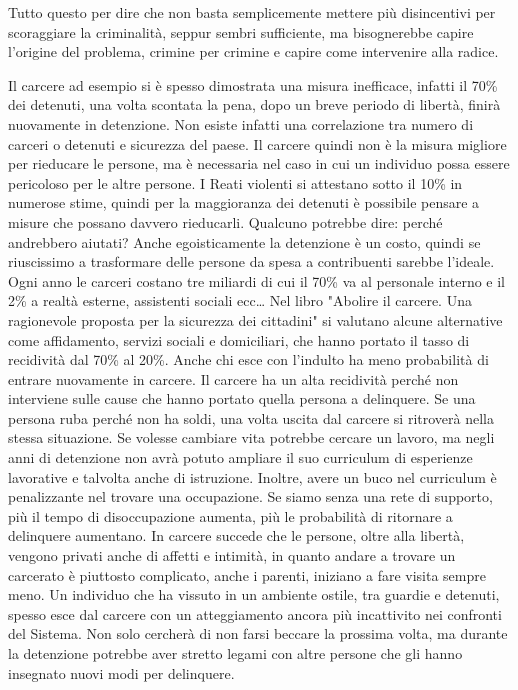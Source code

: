 \documentclass[12pt]{book} %
\begin{document}
Tutto questo per dire che non basta semplicemente mettere più disincentivi per scoraggiare la criminalità, seppur sembri sufficiente, ma bisognerebbe capire l'origine del problema, crimine per crimine e capire come intervenire alla radice.

Il carcere ad esempio si è spesso dimostrata una misura inefficace, infatti il 70\% dei detenuti, una volta scontata la pena, dopo un breve periodo di libertà, finirà nuovamente in detenzione. Non esiste infatti una correlazione tra numero di carceri o detenuti e sicurezza del paese. Il carcere quindi non è la misura migliore per rieducare le persone, ma è necessaria nel caso in cui un individuo possa essere pericoloso per le altre persone.
I Reati violenti si attestano sotto il 10\% in numerose stime, quindi per la maggioranza dei detenuti è possibile pensare a misure che possano davvero rieducarli.
Qualcuno potrebbe dire: perché andrebbero aiutati? Anche egoisticamente la detenzione è un costo, quindi se riuscissimo a trasformare delle persone da spesa a contribuenti sarebbe l'ideale. Ogni anno le carceri costano tre miliardi di cui il 70\% va al personale interno e il 2\% a realtà esterne,
assistenti sociali ecc…
Nel libro "Abolire il carcere. Una ragionevole proposta per la sicurezza dei cittadini"  si valutano alcune alternative come affidamento, servizi sociali e domiciliari, che hanno portato il tasso
di recidività dal 70\% al 20\%. Anche chi esce con l'indulto ha meno probabilità di entrare nuovamente in carcere. 
Il carcere ha un alta recidività perché non interviene sulle cause che hanno portato quella persona a delinquere.
Se una persona ruba perché non ha soldi, una volta uscita dal carcere si ritroverà nella stessa situazione.
Se volesse cambiare vita potrebbe cercare un lavoro, ma negli anni di detenzione non avrà potuto ampliare il suo curriculum di esperienze lavorative e talvolta anche di istruzione. Inoltre, avere un buco nel curriculum è penalizzante nel trovare una occupazione. 
Se siamo senza una rete di supporto, più il tempo di disoccupazione aumenta, più le probabilità di ritornare a delinquere aumentano.
In carcere succede che le persone, oltre alla libertà, vengono privati anche di affetti e intimità, in quanto andare
a trovare un carcerato è piuttosto complicato, anche i parenti, iniziano a fare visita sempre meno. 
Un individuo che ha vissuto in un ambiente ostile, tra guardie e detenuti, spesso esce dal carcere con un atteggiamento ancora più incattivito nei confronti del Sistema. Non solo cercherà di non farsi beccare la prossima volta, ma durante la detenzione potrebbe aver stretto legami con altre persone che gli hanno insegnato nuovi modi per delinquere.
\end{document}
